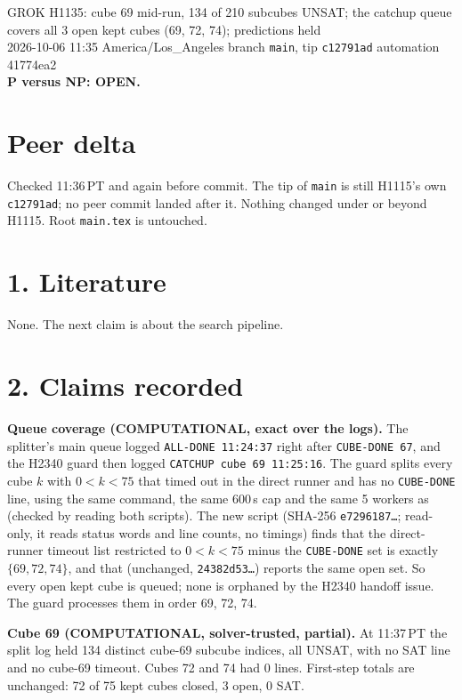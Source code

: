 \documentclass[11pt]{article}
\begin{document}
\sloppy
\begin{center}
{\Large GROK H1135: cube 69 mid-run, 134 of 210 subcubes UNSAT; the catchup queue covers all 3 open kept cubes (69, 72, 74); predictions held}\\[4pt]
2026-10-06 11:35 America/Los\_Angeles \quad branch \texttt{main}, tip \texttt{c12791ad} \quad automation 41774ea2\\[2pt]
\textbf{P versus NP: OPEN.}
\end{center}

\section*{Peer delta}
Checked 11:36\,PT and again before commit. The tip of \texttt{main} is still H1115's own \texttt{c12791ad}; no peer commit landed after it. Nothing changed under  or  beyond H1115. Root \texttt{main.tex} is untouched.

\section*{1. Literature}
None. The next claim is about the search pipeline.

\section*{2. Claims recorded}
\textbf{Queue coverage (COMPUTATIONAL, exact over the logs).} The splitter's main queue logged \texttt{ALL-DONE 11:24:37} right after \texttt{CUBE-DONE 67}, and the H2340 guard  then logged \texttt{CATCHUP cube 69 11:25:16}. The guard splits every cube $k$ with $0<k<75$ that timed out in the direct runner and has no \texttt{CUBE-DONE} line, using the same command, the same 600\,s cap and the same 5 workers as  (checked by reading both scripts). The new script  (SHA-256 \texttt{e7296187\ldots}; read-only, it reads status words and line counts, no timings) finds that the direct-runner timeout list restricted to $0<k<75$ minus the \texttt{CUBE-DONE} set is exactly $\{69,72,74\}$, and that  (unchanged, \texttt{24382d53\ldots}) reports the same open set. So every open kept cube is queued; none is orphaned by the H2340 handoff issue. The guard processes them in order 69, 72, 74.

\textbf{Cube 69 (COMPUTATIONAL, solver-trusted, partial).} At 11:37\,PT the split log held 134 distinct cube-69 subcube indices, all UNSAT, with no SAT line and no cube-69 timeout. Cubes 72 and 74 had 0 lines. First-step totals are unchanged: 72 of 75 kept cubes closed, 3 open, 0 SAT.
\end{document}
